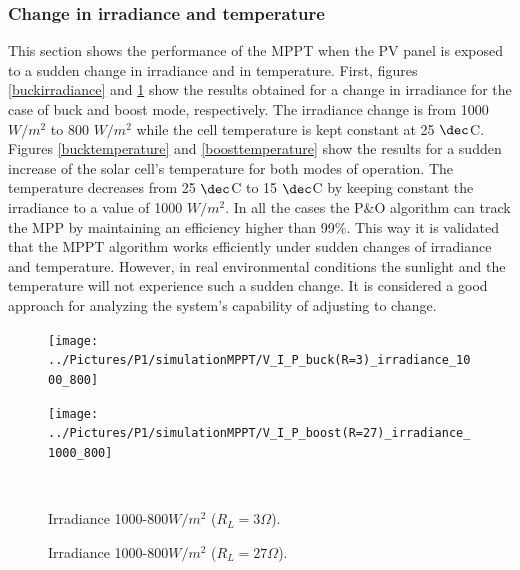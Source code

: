 \subsubsection*{Change in irradiance and temperature}

This section shows the performance of the MPPT when the PV panel is exposed to a sudden change in irradiance and in temperature. First, figures \ref{buckirradiance} and \ref{boostirradiance} show the results obtained for a change in irradiance for the case of buck and boost mode, respectively. The irradiance change is from 1000 $W/ m^2$ to 800 $W/ m^2$ while the cell temperature is kept constant at 25 $\dec$C. 
Figures \ref{bucktemperature} and \ref{boosttemperature}  show the results for a sudden increase of the solar cell's temperature for both modes of operation. The temperature decreases from 25 $\dec$C to 15 $\dec$C by keeping constant the irradiance to a value of 1000 $W/ m^2$. 
In all the cases the P\&O algorithm can track the MPP by maintaining an efficiency higher than 99\%. This way it is validated that the MPPT algorithm works efficiently under sudden changes of irradiance and temperature. However, in real environmental conditions the sunlight and the temperature will not experience such a sudden change. It is considered a good approach for analyzing the system's capability of adjusting to change.

\begin{figure}[H]
	\begin{minipage}[c]{0.5\textwidth}
		\centering
		\texttt{[image: ../Pictures/P1/simulationMPPT/V\_I\_P\_buck(R=3)\_irradiance\_1000\_800]} %
	\end{minipage}%
	\hfill
	\begin{minipage}[c]{0.5\textwidth}
		\centering
		\texttt{[image: ../Pictures/P1/simulationMPPT/V\_I\_P\_boost(R=27)\_irradiance\_1000\_800]} %
	\end{minipage} \\ %
	\begin{minipage}[t]{0.45\textwidth}
		\caption{Irradiance 1000-800$W/ m^2$ ($R_{L}=3\Omega$).} %
		\label{buckirradiance}
	\end{minipage}%
	\hfill
	\begin{minipage}[t]{0.45\textwidth}
		\caption{Irradiance 1000-800$W/ m^2$ ($R_{L}=27\Omega$).} %
		\label{boostirradiance}
	\end{minipage}
\end{figure}



